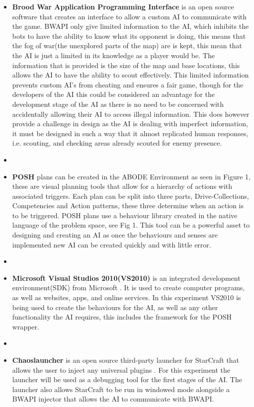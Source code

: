 \documentclass[journal]{IEEEtran}
\begin{document}
\begin{itemize}
	\item \textbf{Brood War Application Programming Interface} \cite{BWAPI} is an open source software that creates an interface to allow a custom AI to communicate with the game. BWAPI only give limited information to the AI, which inhibits the bots to have the ability to know what its opponent is doing, this means that the fog of war(the unexplored parts of the map) are is kept\cite{POSH}, this mean that the AI is just a limited in its knowledge as a player would be. The information that is provided is the size of the map and base locations, this allows the AI to have the ability to scout effectively. This limited information prevents custom AI's from cheating and ensures a fair game, though for the developers of the AI this could be considered an advantage for the development stage of the AI as there is no need to be concerned with accidentally allowing their AI to access illegal information. This does however provide a challenge in design as the AI is dealing with imperfect information, it must be designed in such a way that it almost replicated human responses, i.e. scouting, and checking areas already scouted for enemy presence.
	\item[]
	\item \textbf{POSH} plans can be created in the ABODE Environment as seen in Figure 1, these are visual planning tools that allow for a hierarchy of actions with associated triggers. Each plan can be split into three parts, Drive-Collections, Competencies and Action patterns, these three determine when an action is to be triggered. POSH plans use a behaviour library created in the native language of the problem space, see Fig 1. This tool can be a powerful asset to designing and creating an AI as once the behaviours and senses are implemented new AI can be created quickly and with little error.
	\item[]
	\item \textbf{Microsoft Visual Studios 2010(VS2010)} is an integrated development environment(SDK) from Microsoft \cite{Visual}. It is used to create computer programs, as well as websites, apps, and online services. In this experiment VS2010 is being used to create the behaviours for the AI, as well as any other functionality the AI requires, this includes the framework for the POSH wrapper.
	\item[]
	\item \textbf{Chaoslauncher} is an open source third-party launcher for StarCraft that allows the user to inject any universal plugins \cite{Chaos}. For this experiment the launcher will be used as a debugging tool for the first stages of the AI. The launcher also allows StarCraft to be run in windowed mode alongside a BWAPI injector that allows the AI to communicate with BWAPI.	

\end{itemize}
\end{document}
